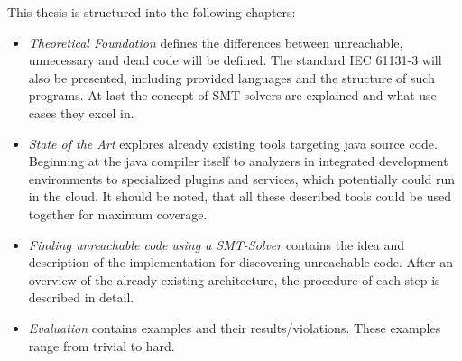 This thesis is structured into the following chapters:
\begin{itemize}
	\item \emph{Theoretical Foundation} defines the differences between unreachable, unnecessary and dead code will be defined. The standard IEC 61131-3 will also be presented, including provided languages and the structure of such programs. At last the concept of SMT solvers are explained and what use cases they excel in.
	\item \emph{State of the Art} explores already existing tools targeting java source code. Beginning at the java compiler itself to analyzers in integrated development environments to specialized plugins and services, which potentially could run in the cloud. It should be noted, that all these described tools could be used together for maximum coverage.
	\item \emph{Finding unreachable code using a SMT-Solver} contains the idea and description of the implementation for discovering unreachable code. After an overview of the already existing architecture, the procedure of each step is described in detail.
	\item \emph{Evaluation} contains examples and their results/violations. These examples range from trivial to hard.
\end{itemize}
